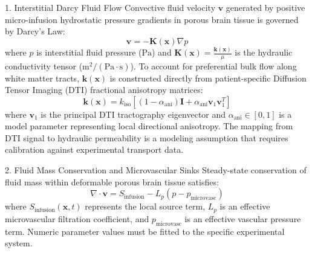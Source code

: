 \documentclass[12pt,a4paper]{article}
\begin{document}
\begin{mathmodelbox}{1. Interstitial Darcy Fluid Flow}
Convective fluid velocity $\mathbf{v}$ generated by positive micro-infusion hydrostatic pressure gradients in porous brain tissue is governed by Darcy's Law:
\begin{equation}
\mathbf{v} = -\mathbf{K}(\mathbf{x}) \nabla p
\end{equation}
where $p$ is interstitial fluid pressure ($\mathrm{Pa}$) and $\mathbf{K}(\mathbf{x}) = \frac{\mathbf{k}(\mathbf{x})}{\mu}$ is the hydraulic conductivity tensor ($\mathrm{m}^2 / (\mathrm{Pa}\cdot\mathrm{s})$). To account for preferential bulk flow along white matter tracts, $\mathbf{k}(\mathbf{x})$ is constructed directly from patient-specific Diffusion Tensor Imaging (DTI) fractional anisotropy matrices:
\begin{equation}
\mathbf{k}(\mathbf{x}) = k_{\text{iso}} \left[ (1 - \alpha_{\text{ani}}) \mathbf{I} + \alpha_{\text{ani}} \mathbf{v}_1 \mathbf{v}_1^T \right]
\end{equation}
where $\mathbf{v}_1$ is the principal DTI tractography eigenvector and $\alpha_{\text{ani}} \in [0, 1]$ is a model parameter representing local directional anisotropy. The mapping from DTI signal to hydraulic permeability is a modeling assumption that requires calibration against experimental transport data.
\end{mathmodelbox}

\begin{mathmodelbox}{2. Fluid Mass Conservation and Microvascular Sinks}
Steady-state conservation of fluid mass within deformable porous brain tissue satisfies:
\begin{equation}
\nabla \cdot \mathbf{v} = S_{\text{infusion}} - L_p \left( p - p_{\text{microvasc}} \right)
\end{equation}
where $S_{\text{infusion}}(\mathbf{x}, t)$ represents the local source term, $L_p$ is an effective microvascular filtration coefficient, and $p_{\text{microvasc}}$ is an effective vascular pressure term. Numeric parameter values must be fitted to the specific experimental system.
\end{mathmodelbox}
\end{document}
